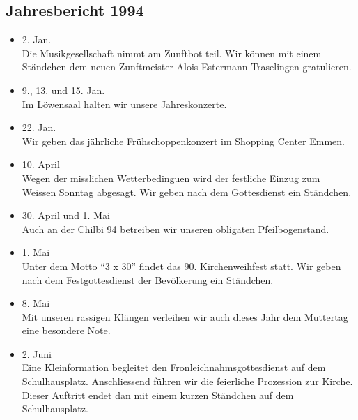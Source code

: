 \subsection{Jahresbericht 1994}

\begin{history}


    \begin{itemize}

        \item[]2. Jan.\\
        Die Musikgesellschaft nimmt am Zunftbot teil. Wir können mit einem
        Ständchen dem neuen Zunftmeister Alois Estermann Traselingen
        gratulieren.

        \item[]9., 13. und 15. Jan.\\
        Im Löwensaal halten wir unsere Jahreskonzerte.

        \item[]22. Jan.\\
        Wir geben das jährliche Frühschoppenkonzert im Shopping Center Emmen.

        \item[]10. April\\
        Wegen der misslichen Wetterbedinguen wird der festliche Einzug zum
        Weissen Sonntag abgesagt. Wir geben nach dem Gottesdienst ein Ständchen.

        \item[]30. April und 1. Mai\\
        Auch an der Chilbi 94 betreiben wir unseren obligaten Pfeilbogenstand.

        \item[]1. Mai\\
        Unter dem Motto \enquote{3 x 30} findet das 90. Kirchenweihfest statt.
        Wir geben nach dem Festgottesdienst der Bevölkerung ein Ständchen.

        \item[]8. Mai\\
        Mit unseren rassigen Klängen verleihen wir auch dieses Jahr dem
        Muttertag eine besondere Note.

        \item[]2. Juni\\
        Eine Kleinformation begleitet den Fronleichnahmsgottesdienst auf dem
        Schulhausplatz. Anschliessend führen wir die feierliche Prozession zur
        Kirche. Dieser Auftritt endet dan mit einem kurzen Ständchen auf dem
        Schulhausplatz.


\end{itemize}
\end{history}
